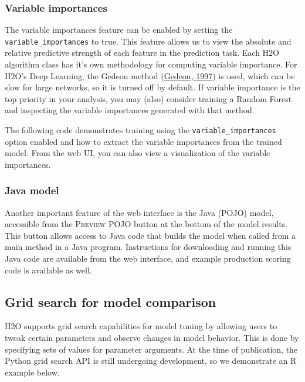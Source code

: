 \subsubsection{Variable importances} 

The variable importances feature can be enabled by setting the \texttt{variable\_importances} to true. This feature allows us to view the absolute and relative predictive strength of each feature in the prediction task.  Each H2O algorithm class has it's own methodology for computing variable importance.  For H2O's Deep Learning, the Gedeon method (\href{http://cs.anu.edu.au/people/Tom.Gedeon/pdfs/ContribDataMinv2.pdf}{Gedeon, 1997}) is used, which can be slow for large networks, so it is turned off by default.  If variable importance is the top priority in your analysis, you may (also) consider training a Random Forest and inspecting the variable importances generated with that method.

The following code demonstrates training using the \texttt{variable\_importances} option enabled and how to extract the variable importances from the trained model.  From the web UI, you can also view a visualization of the variable importances.

\waterExampleInR


\newpage
\waterExampleInPython




\subsubsection{Java model} 

Another important feature of the web interface is the Java (POJO) model, accessible from the \textsc{Preview POJO} button at the bottom of the model results. This button allows access to Java code that builds the model when called from a main method in a Java program. Instructions for downloading and running this Java code are available from the web interface, and example production scoring code is available as well.

\subsection{Grid search for model comparison} 

H2O supports grid search capabilities for model tuning by allowing users to tweak certain parameters and observe changes in model behavior. This is done by specifying sets of values for parameter arguments. At the time of publication, the Python grid search API is still undergoing development, so we demonstrate an R example below.   

